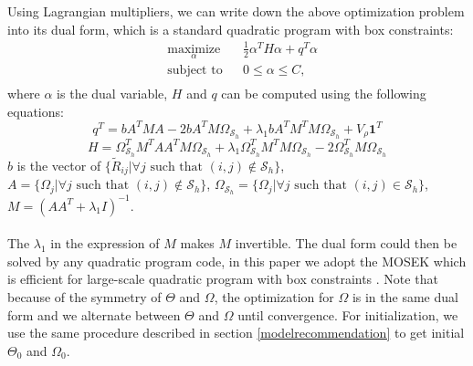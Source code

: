 \documentclass{article} %
\begin{document}
Using Lagrangian multipliers, we can write down the above optimization problem into its dual form, which is a standard quadratic program with box constraints:
\begin{equation}
\begin{aligned}
& \underset{\alpha}{\text{maximize}}
& & \frac{1}{2}\alpha^TH\alpha+q^T\alpha\\
& \text{subject to}
& & 0\leq\alpha{\leq}C, \\
\end{aligned}
\label{hirlmfdual}
\end{equation}
where $\alpha$ is the dual variable, $H$ and $q$ can be computed using the following equations:
$$q^T=bA^TMA-2bA^TM\Omega_{\mathcal{S}_h}+\lambda_1bA^TM^TM\Omega_{\mathcal{S}_h}+V_\rho\mathbf{1}^T$$
$$H=\Omega_{\mathcal{S}_h}^TM^TAA^TM\Omega_{\mathcal{S}_h}+\lambda_1\Omega_{\mathcal{S}_h}^TM^TM\Omega_{\mathcal{S}_h}-2\Omega_{\mathcal{S}_h}^TM\Omega_{\mathcal{S}_h}$$
$b$ is the vector of $\{\tilde{R}_{ij}|{\forall}j \text{ such that } (i,j)\not\in\mathcal{S}_h\}$, $A=\{\Omega_j|{\forall}j \text{ such that } (i,j)\not\in\mathcal{S}_h\}$, $\Omega_{\mathcal{S}_h}=\{\Omega_j|{\forall}j \text{ such that } (i,j)\in\mathcal{S}_h\}$, $M=(AA^T+\lambda_1I)^{-1}$. \\\\
The $\lambda_1$ in the expression of $M$ makes $M$ invertible. The dual form could then be solved by any quadratic program code, in this paper we adopt the MOSEK which is efficient for large-scale quadratic program with box constraints \cite{mosek}. Note that because of the symmetry of $\Theta$ and $\Omega$, the optimization for $\Omega$ is in the same dual form and we alternate between $\Theta$ and $\Omega$ until convergence. For initialization, we use the same procedure described in section \ref{modelrecommendation} to get initial $\Theta_0$ and $\Omega_0$.


\end{document}
